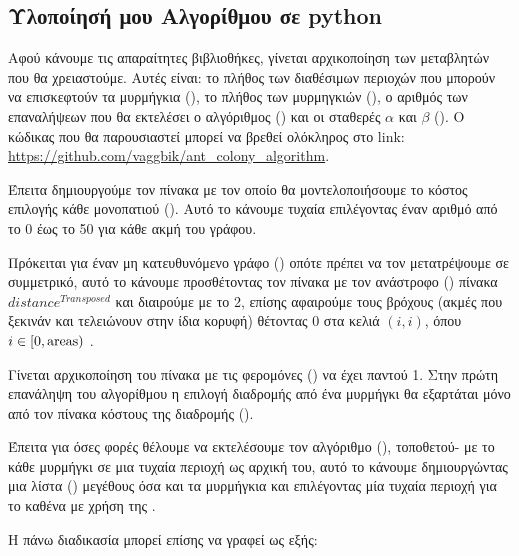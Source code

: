 \subsection{Υλοποίησή μου Αλγορίθμου σε python}
Αφού κάνουμε  τις απαραίτητες βιβλιοθήκες, γίνεται αρχικοποίηση των μεταβλητών που θα χρειαστούμε. Αυτές είναι: το πλήθος των διαθέσιμων περιοχών που μπορούν να επισκεφτούν τα μυρμήγκια (), το πλήθος των μυρμηγκιών (), ο αριθμός των επαναλήψεων που θα εκτελέσει ο αλγόριθμος () και οι σταθερές $\alpha$ και $\beta$ (). Ο κώδικας που θα παρουσιαστεί μπορεί να βρεθεί ολόκληρος στο link: \url{https://github.com/vaggbik/ant_colony_algorithm}.


Έπειτα δημιουργούμε τον πίνακα με τον οποίο θα μοντελοποιήσουμε το κόστος επιλογής κάθε μονοπατιού (). Αυτό το κάνουμε τυχαία επιλέγοντας έναν αριθμό από το 0 έως το 50 για κάθε ακμή του γράφου.


Πρόκειται για έναν μη κατευθυνόμενο γράφο () οπότε πρέπει να τον μετατρέψουμε σε συμμετρικό, αυτό το κάνουμε προσθέτοντας τον πίνακα  με τον ανάστροφο () πίνακα $distance^{Transposed}$ και διαιρούμε με το 2, επίσης αφαιρούμε τους βρόχους (ακμές που ξεκινάν και τελειώνουν στην ίδια κορυφή) θέτοντας 0 στα κελιά $(i,i)$, όπου $i\in[0,\rm{areas})$ \cite{perez2020introduction}.


Γίνεται αρχικοποίηση του πίνακα με τις φερομόνες () να έχει παντού 1. Στην πρώτη επανάληψη του αλγορίθμου η επιλογή διαδρομής από ένα μυρμήγκι θα εξαρτάται μόνο από τον πίνακα κόστους της διαδρομής (). 


Έπειτα για όσες φορές θέλουμε να εκτελέσουμε τον αλγόριθμο (),
τοποθετού- με το κάθε μυρμήγκι σε μια τυχαία περιοχή ως αρχική του, αυτό το κάνουμε δημιουργώντας μια λίστα () μεγέθους όσα και τα μυρμήγκια και επιλέγοντας μία τυχαία περιοχή για το καθένα με χρήση της  \cite{w3school}.

Η πάνω διαδικασία μπορεί επίσης να γραφεί ως εξής: 


